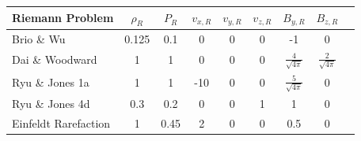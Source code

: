 \documentclass[modern, linenumbers]{aastex631}
\begin{document}
\begin{table}
\begin{tabular}{lcccccccccc}
    
    
    \end{tabular}
    \newline
    \newline
    \newline
    \begin{tabular}{lcccccccc}
    
    
    
    
    
        Riemann Problem & $\rho_R$ & $P_R$ & $v_{x,R}$ & $v_{y,R}$ & $v_{z,R}$ & $B_{y,R}$ & $B_{z,R}$ \\ \hline
    
        Brio \& Wu           & 0.125 & 0.1  & 0     & 0   & 0   & -1                      & 0                       \\ \hline
        Dai \& Woodward      & 1     & 1    & 0     & 0   & 0   & $\frac{4}{\sqrt{4\pi}}$ & $\frac{2}{\sqrt{4\pi}}$ \\ \hline
        Ryu \& Jones 1a      & 1     & 1    & -10   & 0   & 0   & $\frac{5}{\sqrt{4\pi}}$ & 0                       \\ \hline
        Ryu \& Jones 4d      & 0.3   & 0.2  & 0     & 0   & 1   & 1                       & 0                       \\ \hline
        Einfeldt Rarefaction & 1     & 0.45 & 2     & 0   & 0   & 0.5                     & 0                       \\ \hline
    

\end{tabular}
\end{table}
\end{document}
